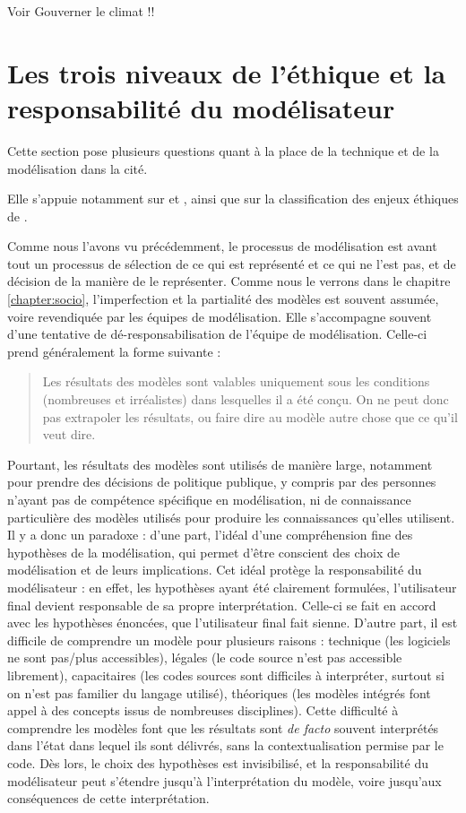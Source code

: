 \begin{tcolorbox}
    Voir Gouverner le climat !!
\end{tcolorbox}


\section{Les trois niveaux de l'éthique et la responsabilité du modélisateur}

Cette section pose plusieurs questions quant à la place de la technique et de la modélisation dans la cité. 

Elle s'appuie notamment sur \cite{jonas_principe_2008} et \cite{vast machine}, ainsi que sur la classification des enjeux éthiques de \cite{tuana_leading_2010}.


Comme nous l'avons vu précédemment, le processus de modélisation est avant tout un processus de sélection de ce qui est représenté et ce qui ne l'est pas, et de décision de la manière de le représenter. Comme nous le verrons dans le chapitre \ref{chapter:socio}, l'imperfection et la partialité des modèles est souvent assumée, voire revendiquée par les équipes de modélisation. Elle s'accompagne souvent d'une tentative de dé-responsabilisation de l'équipe de modélisation. Celle-ci prend généralement la forme suivante : 

\begin{quote}
    Les résultats des modèles sont valables uniquement sous les conditions (nombreuses et irréalistes) dans lesquelles il a été conçu. On ne peut donc pas extrapoler les résultats, ou faire dire au modèle autre chose que ce qu'il veut dire. 
\end{quote}
Pourtant, les résultats des modèles sont utilisés de manière large, notamment pour prendre des décisions de politique publique, y compris par des personnes n'ayant pas de compétence spécifique en modélisation, ni de connaissance particulière des modèles utilisés pour produire les connaissances qu'elles utilisent. Il y a donc un paradoxe : d'une part, l'idéal d'une compréhension fine des hypothèses de la modélisation, qui permet d'être conscient des choix de modélisation et de leurs implications. Cet idéal protège la responsabilité du modélisateur : en effet, les hypothèses ayant été clairement formulées, l'utilisateur final devient responsable de sa propre interprétation. Celle-ci se fait en accord avec les hypothèses énoncées, que l'utilisateur final fait sienne. D'autre part, il est difficile de comprendre un modèle pour plusieurs raisons : technique (les logiciels ne sont pas/plus accessibles), légales (le code source n'est pas accessible librement), capacitaires (les codes sources sont difficiles à interpréter, surtout si on n'est pas familier du langage utilisé), théoriques (les modèles intégrés font appel à des concepts issus de nombreuses disciplines). Cette difficulté à comprendre les modèles font que les résultats sont \textit{de facto} souvent interprétés dans l'état dans lequel ils sont délivrés, sans la contextualisation permise par le code. Dès lors, le choix des hypothèses est invisibilisé, et la responsabilité du modélisateur peut s'étendre jusqu'à l'interprétation du modèle, voire jusqu'aux conséquences de cette interprétation. \\

